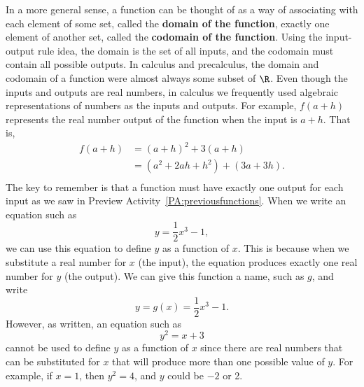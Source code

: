 In a more general sense, a function can be thought of as a way of associating with each element of some set, called the \textbf{domain of the function},
%
 exactly one element of another set, called the \textbf{codomain of the function}.
%
  Using the input-output rule idea, the domain is the set of all inputs, and the codomain must contain all possible outputs.  In calculus and precalculus, the domain and codomain of a function were almost always some subset of  $\R$.  
%
%
%
Even though the inputs and outputs are real numbers, in calculus we frequently used algebraic representations of numbers as the inputs and outputs.  For example,  $f\left( {a + h} \right)$
 represents the real number output of the function when the input is  $a + h$.  That is,
\[
\begin{aligned}
  f( {a + h} ) &= \left( {a + h} \right)^2  + 3( {a + h} ) \\ 
                          &= \left( {a^2  + 2ah + h^2 } \right) + \left( {3a + 3h} \right)\!. \\ 
\end{aligned} 
\]
The key to remember is that a function must have exactly one output for each input as we saw in Preview Activity~\ref{PA:previousfunctions}.  When we write an equation such as  
\[
y = \dfrac{1}{2}x^3  - 1,
\]
we can use this equation to define  $y$  as a function of  $x$.  This is because when we substitute a real number for  $x$  (the input), the equation produces exactly one real number for  $y$  (the output).  We can give this function a name, such as  $g$, and write
\[
y = g( x ) = \frac{1}{2}x^3  - 1.
\]
However, as written, an equation such as  
\[
y^2  = x + 3
\]
cannot be used to define  $y$  as a function of  $x$  since there are real numbers that can be substituted for  $x$  that will produce more than one possible value of  $y$.  For example,  if  $x = 1$, then  $y^2  = 4$, and  $y$  could be  $-2$  or  2.
\hbreak
%
